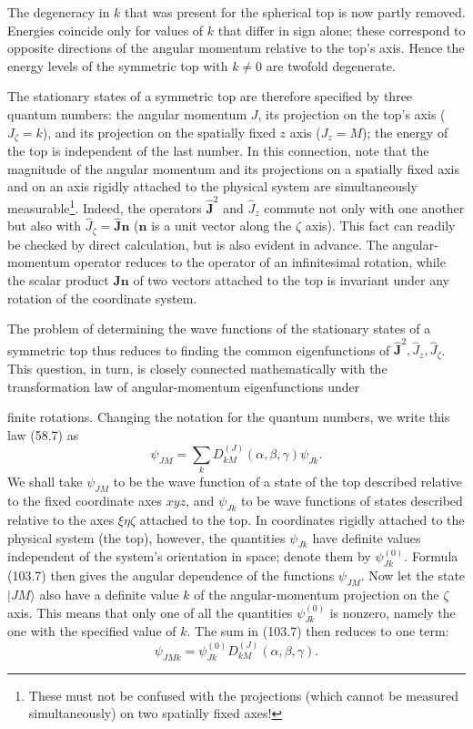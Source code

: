 The degeneracy in $k$ that was present for the spherical top is now partly removed. Energies coincide only for values of $k$ that differ in sign alone; these correspond to opposite directions of the angular momentum relative to the top's axis. Hence the energy levels of the symmetric top with $k\ne0$ are twofold degenerate.

The stationary states of a symmetric top are therefore specified by three quantum numbers: the angular momentum $J$, its projection on the top's axis ($J_\zeta=k$), and its projection on the spatially fixed $z$ axis ($J_z=M$); the energy of the top is independent of the last number. In this connection, note that the magnitude of the angular momentum and its projections on a spatially fixed axis and on an axis rigidly attached to the physical system are simultaneously measurable\footnote{These must not be confused with the projections (which cannot be measured simultaneously) on two spatially fixed axes!}. Indeed, the operators $\hat{\mathbf J}^{2}$ and $\hat J_z$ commute not only with one another but also with $\hat J_\zeta=\hat{\mathbf J}\mathbf n$ ($\mathbf n$ is a unit vector along the $\zeta$ axis). This fact can readily be checked by direct calculation, but is also evident in advance. The angular-momentum operator reduces to the operator of an infinitesimal rotation, while the scalar product $\mathbf J\mathbf n$ of two vectors attached to the top is invariant under any rotation of the coordinate system.

The problem of determining the wave functions of the stationary states of a symmetric top thus reduces to finding the common eigenfunctions of $\hat{\mathbf J}^{2},\hat J_z,\hat J_\zeta$. This question, in turn, is closely connected mathematically with the transformation law of angular-momentum eigenfunctions under

finite rotations. Changing the notation for the quantum numbers, we write this law (58.7) as
\begin{equation}
 \psi_{JM}=\sum_k D_{kM}^{(J)}(\alpha,\beta,\gamma)\psi_{Jk}. \tag{103.7}
\end{equation}
We shall take $\psi_{JM}$ to be the wave function of a state of the top described relative to the fixed coordinate axes $xyz$, and $\psi_{Jk}$ to be wave functions of states described relative to the axes $\xi\eta\zeta$ attached to the top. In coordinates rigidly attached to the physical system (the top), however, the quantities $\psi_{Jk}$ have definite values independent of the system's orientation in space; denote them by $\psi_{Jk}^{(0)}$. Formula (103.7) then gives the angular dependence of the functions $\psi_{JM}$. Now let the state $|JM\rangle$ also have a definite value $k$ of the angular-momentum projection on the $\zeta$ axis. This means that only one of all the quantities $\psi_{Jk}^{(0)}$ is nonzero, namely the one with the specified value of $k$. The sum in (103.7) then reduces to one term:
\[
 \psi_{JMk}=\psi_{Jk}^{(0)}D_{kM}^{(J)}(\alpha,\beta,\gamma).
\]

